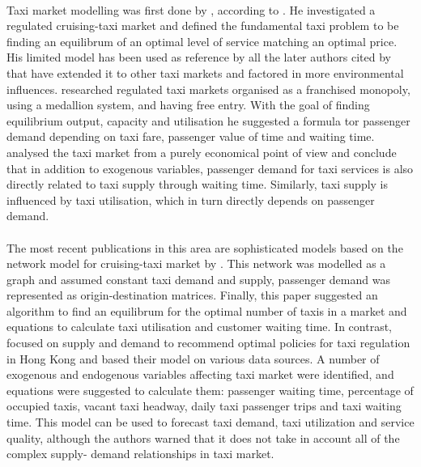 \paragraph{}Taxi market modelling was first done by
\textcite{Douglas1972taxi+regulation}, according to
\textcite{Salanova2011taxi+review}. He investigated a regulated cruising-taxi
market and defined the fundamental taxi problem to be finding an equilibrum of
an optimal level of service matching an optimal price. His limited model has
been used as reference by all the later authors cited by
\textcite{Salanova2011taxi+review} that have extended it to other taxi markets
and factored in more environmental influences.
\textcite{Devany1975taxi+capacity} researched regulated taxi markets organised
as a franchised monopoly, using a medallion system, and having free entry. With
the goal of finding equilibrium output, capacity and utilisation he suggested a
formula tor passenger demand depending on taxi fare, passenger value of time
and waiting time. \textcite{Manski1967taxi+demand} analysed the taxi market
from a purely economical point of view and conclude that in addition to
exogenous variables, passenger demand for taxi services is also directly
related to taxi supply through waiting time. Similarly, taxi supply is
influenced by taxi utilisation, which in turn directly depends on passenger
demand.

\paragraph{}The most recent publications in this area are sophisticated models
based on the network model for cruising-taxi market by
\textcite{Yang1998taxi+network}. This network was modelled as a graph and
assumed constant taxi demand and supply, passenger demand was represented as
origin-destination matrices. Finally, this paper suggested an algorithm to find
an equilibrum for the optimal number of taxis in a market and equations to
calculate taxi utilisation and customer waiting time. In contrast,
\textcite{Yang2000taxi+utilization} focused on supply and demand to recommend
optimal policies for taxi regulation in Hong Kong and based their model on
various data sources. A number of exogenous and endogenous variables affecting
taxi market were identified, and equations were suggested to calculate them:
passenger waiting time, percentage of occupied taxis, vacant taxi headway,
daily taxi passenger trips and taxi waiting time. This model can be used to
forecast taxi demand, taxi utilization and service quality, although the
authors warned that it does not take in account all of the complex supply-
demand relationships in taxi market.

